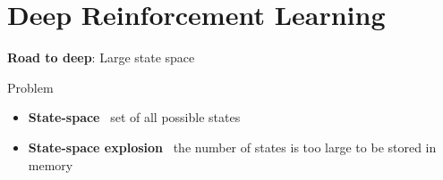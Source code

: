 \documentclass[presentation, 9pt]{beamer}\mode<presentation>{\usetheme{AMSBolognaFC}}
\begin{document}
\section{Deep Reinforcement Learning}
\begin{frame}{\textbf{Road to deep}: Large state space}
\begin{block}{Problem}
	\begin{itemize}
		\item \textbf{State-space} \faArrowRight \, set of all possible states
		\item \textbf{State-space explosion} \faArrowRight \, the number of states is too large to be stored in memory
	\end{itemize}
\end{block}
\begin{columns}
	\begin{column}{0.5\textwidth}
		

\end{column}
\end{columns}
\end{frame}
\end{document}
